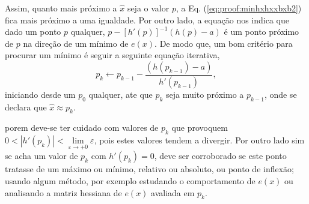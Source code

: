 \begin{myproofT}
Assim, quanto mais próximo a $\hat{x}$ seja  o valor $p$, 
a Eq. (\ref{eq:proof:minhxhxxbxb2}) fica mais próximo a uma igualdade. Por outro lado,
a equação nos indica que dado um ponto  $p$ qualquer,
$p - \left[ h'(p) \right]^{-1}\left(h(p)-a\right)$
é um ponto próximo de $p$  na direção de um mínimo de $e(x)$.
De modo que, um bom critério para procurar um mínimo é seguir a seguinte 
equação iterativa,
\begin{equation}\label{eq:proof:minhxhxxbxb3}
p_{k} \leftarrow p_{k-1} - \frac{ \left(h(p_{k-1})-a\right)}{h'(p_{k-1})},
\end{equation}
iniciando desde um $p_{0}$ qualquer, ate que $p_{k}$ seja muito próximo a $p_{k-1}$,
onde se declara que $\hat{x} \approx p_{k}$. 


porem deve-se ter cuidado com valores de $p_{k}$ que provoquem 
$0<|h'(p_{k})|<\lim\limits_{\varepsilon \rightarrow +0}\varepsilon$,
pois estes valores tendem a divergir. Por outro lado sim se acha um valor 
de $p_{k}$ com $h'(p_{k})= 0$, deve ser
corroborado se este ponto tratasse de um máximo ou mínimo, relativo ou absoluto, ou ponto de inflexão;
usando algum método, por exemplo estudando o comportamento 
de $e(x)$ ou analisando a matriz hessiana de $e(x)$ avaliada em $p_{k}$.

\end{myproofT}